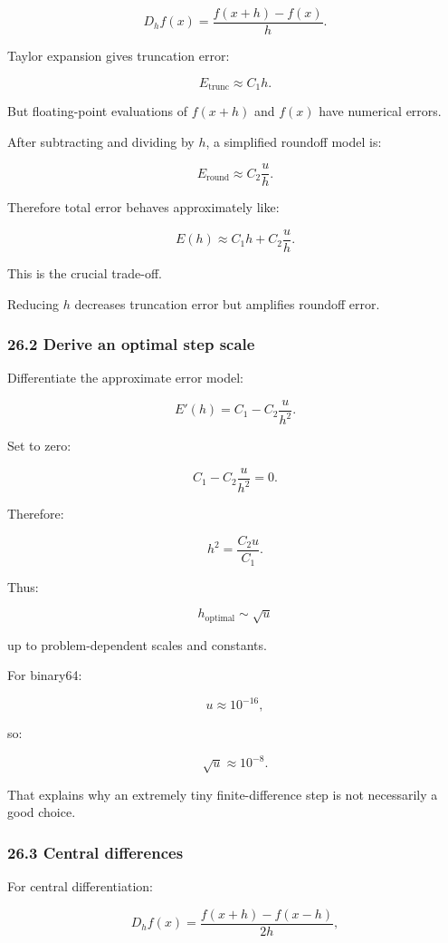 \[ D_hf(x)= \frac{f(x+h)-f(x)}{h}. \]

Taylor expansion gives truncation error:

\[ \boxed{ E_{\mathrm{trunc}}\approx C_1h }. \]

But floating-point evaluations of \(f(x+h)\) and \(f(x)\) have numerical errors.

After subtracting and dividing by \(h\), a simplified roundoff model is:

\[ \boxed{ E_{\mathrm{round}}\approx C_2\frac uh }. \]

Therefore total error behaves approximately like:

\[ \boxed{ E(h)\approx C_1h+C_2\frac uh }. \]

This is the crucial trade-off.

Reducing \(h\) decreases truncation error but amplifies roundoff error.

\subsubsection{26.2 Derive an optimal step scale}\label{derive-an-optimal-step-scale}

Differentiate the approximate error model:

\[ E'(h)=C_1-C_2\frac u{h^2}. \]

Set to zero:

\[ C_1-C_2\frac u{h^2}=0. \]

Therefore:

\[ h^2=\frac{C_2u}{C_1}. \]

Thus:

\[ \boxed{ h_{\mathrm{optimal}} \sim\sqrt u } \]

up to problem-dependent scales and constants.

For binary64:

\[ u\approx10^{-16}, \]

so:

\[ \sqrt u\approx10^{-8}. \]

That explains why an extremely tiny finite-difference step is not necessarily a good choice.

\subsubsection{26.3 Central differences}\label{central-differences}

For central differentiation:

\[ D_hf(x)= \frac{f(x+h)-f(x-h)}{2h}, \]

